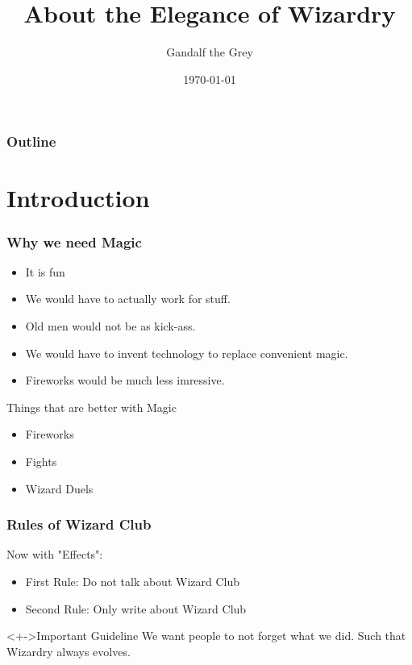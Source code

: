 \documentclass[]{beamer}
\author[G. Grey]{Gandalf the Grey}
\date{\today}
\institute[MIT]{Minas Tirith Intstitute of Technology}
\title[About Wizardry]{About the Elegance of Wizardry}
\begin{document}
\frame{\titlepage}

\begin{frame}
  \frametitle{Outline}
  \tableofcontents
\end{frame}



\section{Introduction}

\begin{frame}
  \frametitle{Why we need Magic}
 \begin{itemize}
   \item It is fun
   \item We would have to actually work for stuff.
   \item Old men would not be as kick-ass.
   \item We would have to invent technology to replace convenient magic.
   \item Fireworks would be much less imressive.
 \end{itemize}

 \begin{block}{Things that are better with Magic}
   \begin{itemize}
     \item Fireworks
     \item Fights
     \item Wizard Duels
   \end{itemize}
 \end{block}
\end{frame}


\begin{frame}
  \frametitle{Rules of Wizard Club}
  Now with "Effects":
  \pause
  \begin{itemize}[<+->]
    \item  First Rule: Do not talk about Wizard Club
    \item  Second Rule: Only write about Wizard Club
  \end{itemize}


  \begin{alertblock}<+->{Important Guideline}
    We want people to not forget what we did. Such that Wizardry
    always evolves.
  \end{alertblock}
\end{frame}
\end{document}

